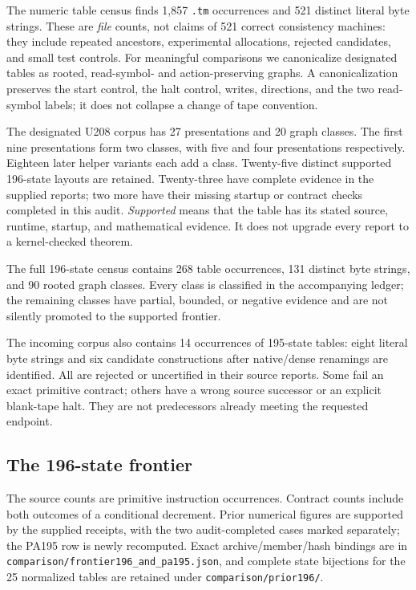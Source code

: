 \documentclass[11pt,letterpaper]{article}
\newcommand{\file}[1]{\texttt{\nolinkurl{#1}}}
\begin{document}
The numeric table census finds 1,857 \file{.tm} occurrences and 521
distinct literal byte strings. These are \emph{file} counts, not claims
of 521 correct consistency machines: they include repeated ancestors,
experimental allocations, rejected candidates, and small test controls.
For meaningful comparisons we canonicalize designated tables as rooted,
read-symbol- and action-preserving graphs. A canonicalization preserves
the start control, the halt control, writes, directions, and the two
read-symbol labels; it does not collapse a change of tape convention.

The designated U208 corpus has 27 presentations and 20 graph classes.
The first nine presentations form two classes, with five and four
presentations respectively. Eighteen later helper variants each add a
class. Twenty-five distinct supported 196-state layouts are retained.
Twenty-three have complete evidence in the supplied reports; two more
have their missing startup or contract checks completed in this audit.
\emph{Supported} means that the table has its stated source, runtime,
startup, and mathematical evidence.
It does not upgrade every report to a kernel-checked theorem.

The full 196-state census contains 268 table occurrences, 131 distinct
byte strings, and 90 rooted graph classes. Every class is classified in
the accompanying ledger; the remaining classes have partial, bounded,
or negative evidence and are not silently promoted to the supported frontier.

The incoming corpus also contains 14 occurrences of 195-state tables:
eight literal byte strings and six candidate constructions after
native/dense renamings are identified. All are rejected or uncertified
in their source reports. Some fail an exact primitive contract; others
have a wrong source successor or an explicit blank-tape halt. They are
not predecessors already meeting the requested endpoint.

\clearpage
\subsection{The 196-state frontier}

The source counts are primitive instruction occurrences. Contract counts
include both outcomes of a conditional decrement. Prior numerical
figures are supported by the supplied receipts, with the two audit-completed
cases marked separately; the PA195 row is newly recomputed. Exact archive/member/hash bindings are in
\file{comparison/frontier196_and_pa195.json}, and complete state
bijections for the 25 normalized tables are retained under
\file{comparison/prior196/}.
\end{document}
